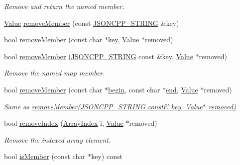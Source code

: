 \begin{DoxyCompactItemize}
\begin{DoxyCompactList}\small\item\em Remove and return the named member. \end{DoxyCompactList}\item 
\hyperlink{class_json_1_1_value}{Value} \hyperlink{class_json_1_1_value_a1dfd5d30fbc53fcd9c4955b8b3e7885c}{remove\+Member} (const \hyperlink{json_8h_a1e723f95759de062585bc4a8fd3fa4be}{J\+S\+O\+N\+C\+P\+P\+\_\+\+S\+T\+R\+I\+NG} \&key)
\item 
bool \hyperlink{class_json_1_1_value_a708e599489adf30d65bf85a8ee16e6fb}{remove\+Member} (const char $\ast$key, \hyperlink{class_json_1_1_value}{Value} $\ast$removed)
\item 
bool \hyperlink{class_json_1_1_value_ae385ecef98427970df525ee876e9f54a}{remove\+Member} (\hyperlink{json_8h_a1e723f95759de062585bc4a8fd3fa4be}{J\+S\+O\+N\+C\+P\+P\+\_\+\+S\+T\+R\+I\+NG} const \&key, \hyperlink{class_json_1_1_value}{Value} $\ast$removed)
\begin{DoxyCompactList}\small\item\em Remove the named map member. \end{DoxyCompactList}\item 
bool \hyperlink{class_json_1_1_value_a49c91af727d6b4eb0af02a81bb2def87}{remove\+Member} (const char $\ast$\hyperlink{class_json_1_1_value_a015459a3950c198d63a2d3be8f5ae296}{begin}, const char $\ast$\hyperlink{class_json_1_1_value_a3e443cd0ef24f7e028b175e47ee045e0}{end}, \hyperlink{class_json_1_1_value}{Value} $\ast$removed)
\begin{DoxyCompactList}\small\item\em Same as \hyperlink{class_json_1_1_value_ae385ecef98427970df525ee876e9f54a}{remove\+Member(\+J\+S\+O\+N\+C\+P\+P\+\_\+\+S\+T\+R\+I\+N\+G const\& key, Value$\ast$ removed)} \end{DoxyCompactList}\item 
bool \hyperlink{class_json_1_1_value_ae9e67e08a85a2f3be3396ec0f4c47f65}{remove\+Index} (\hyperlink{class_json_1_1_value_a184a91566cccca7b819240f0d5561c7d}{Array\+Index} i, \hyperlink{class_json_1_1_value}{Value} $\ast$removed)
\begin{DoxyCompactList}\small\item\em Remove the indexed array element. \end{DoxyCompactList}\item 
bool \hyperlink{class_json_1_1_value_ad6d4df2227321bab05e86667609a7fad}{is\+Member} (const char $\ast$key) const
\item 

\end{DoxyCompactItemize}

